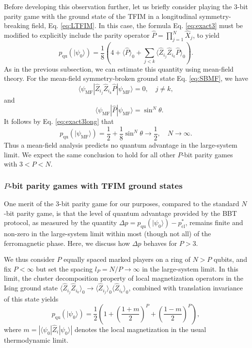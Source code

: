 \documentclass[prb,twocolumn,showpacs,amssymb,superscriptaddress]{revtex4-2}
\begin{document}
Before developing this observation further, let us briefly consider playing the 3-bit parity game with the ground state of the TFIM in a longitudinal symmetry-breaking field, Eq. \eqref{eq:LTFIM}. In this case, the formula Eq. \eqref{eq:exact3} must be modified to explicitly include the parity operator $\hat{P} =\prod_{j=1}^N \hat{X}_j$, to yield
\begin{equation}
\label{eq:exact3long}
p_{\mathrm{qu}}(|\psi_0\rangle) = \frac{1}{8}\left(4+ \langle \hat{P}\rangle_0 + \sum_{j<k} \langle \hat{Z}_{i_j}\hat{Z}_{i_k}\hat{P}\rangle_0 \right).
\end{equation}
As in the previous subsection, we can estimate this quantity using mean-field theory. For the mean-field symmetry-broken ground state Eq. \eqref{eq:SBMF}, we have
\begin{equation}
\langle \psi_{\mathrm{MF}} | \hat{Z}_{i_j} \hat{Z}_{i_k} \hat{P} | \psi_{\mathrm{MF}} \rangle = 0, \quad j\neq k,
\end{equation}
and
\begin{equation}
\quad \langle \psi_{\mathrm{MF}} |\hat{P} | \psi_{\mathrm{MF}} \rangle = \sin^{N}\theta.
\end{equation}
It follows by Eq. \eqref{eq:exact3long} that
\begin{equation}
p_{\mathrm{qu}}(|\psi_{\mathrm{MF}}\rangle) = \frac{1}{2}+\frac{1}{8}\sin^{N}{\theta} \to \frac{1}{2}, \quad N \to \infty.
\end{equation}
Thus a mean-field analysis predicts no quantum advantage in the large-system limit. We expect the same conclusion to hold for all other $P$-bit parity games with $3 < P < N$.

\subsubsection{$P$-bit parity games with TFIM ground states}

One merit of the $3$-bit parity game for our purposes, compared to the standard $N$-bit parity game, is that the level of quantum advantage provided by the BBT protocol, as measured by the quantity $\Delta p = p_{\mathrm{qu}}(|\psi_0\rangle) - p_{\mathrm{cl}}^*$, remains finite and non-zero in the large-system limit within most (though not all) of the ferromagnetic phase. Here, we discuss how $\Delta p$ behaves for $P>3$.

We thus consider $P$ equally spaced marked players on a ring of $N > P$ qubits, and fix $P < \infty$ but set the spacing $l_P = N/P \to \infty$ in the large-system limit. In this limit, the cluster decomposition property of local magnetization operators in the Ising ground state\cite{pfeuty1970one} $\langle \hat{Z}_{i_j} \hat{Z}_{i_k}\rangle_0 \to \langle \hat{Z}_{i_j} \rangle_0 \langle \hat{Z}_{i_k} \rangle_0$, combined with translation invariance of this state yields
\begin{equation}
\label{eq:MFmanyplayers}
p_{\mathrm{qu}}(|\psi_0\rangle) = \frac{1}{2}\left(1 + \left(\frac{1+m}{2}\right)^P +  \left(\frac{1-m}{2}\right)^P \right),
\end{equation}
where $m = |\langle \psi_0 | \hat{Z}_i | \psi_0\rangle|$ denotes the local magnetization in the usual thermodynamic limit.
\end{document}
